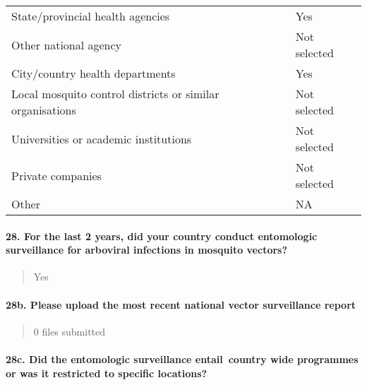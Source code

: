 \documentclass[
]{article}
\begin{document}
\begin{longtable}[]{@{}ll@{}}
\toprule
\endhead
State/provincial health agencies & Yes \\
Other national agency & Not selected \\
City/country health departments & Yes \\
Local mosquito control districts or similar organisations & Not
selected \\
Universities or academic institutions & Not selected \\
Private companies & Not selected \\
Other & NA \\
\bottomrule
\end{longtable}

\hypertarget{for-the-last-2-years-did-your-country-conduct-entomologic-surveillance-for-arboviral-infections-in-mosquito-vectors}{%
\paragraph{28. For the last 2 years, did your country conduct
entomologic surveillance for arboviral infections in mosquito
vectors?}\label{for-the-last-2-years-did-your-country-conduct-entomologic-surveillance-for-arboviral-infections-in-mosquito-vectors}}

\begin{quote}
Yes
\end{quote}

\hypertarget{b.-please-upload-the-most-recent-national-vector-surveillance-report}{%
\paragraph{28b. Please upload the most recent national vector
surveillance
report}\label{b.-please-upload-the-most-recent-national-vector-surveillance-report}}

\begin{quote}
0 files submitted
\end{quote}

\hypertarget{c.-did-the-entomologic-surveillance-entail-country-wide-programmes-or-was-it-restricted-to-specific-locations}{%
\paragraph{28c. Did the entomologic surveillance entail~country wide
programmes or was it restricted to specific
locations?}\label{c.-did-the-entomologic-surveillance-entail-country-wide-programmes-or-was-it-restricted-to-specific-locations}}
\end{document}
